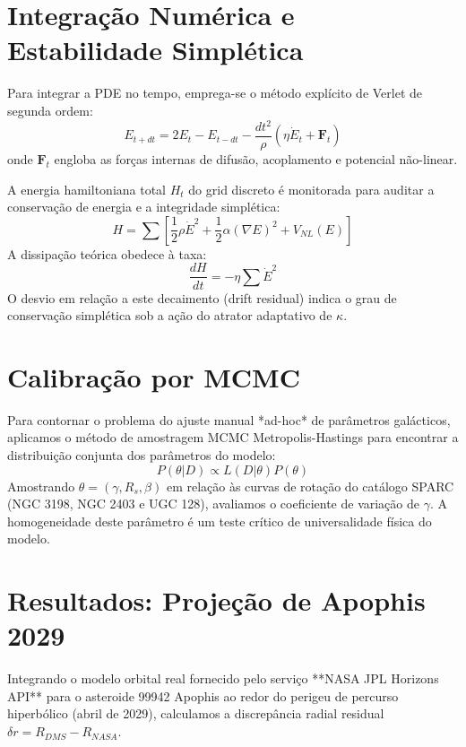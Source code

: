 \documentclass[11pt,twocolumn]{article}
\begin{document}
\section{Integração Numérica e Estabilidade Simplética}
Para integrar a PDE no tempo, emprega-se o método explícito de Verlet de segunda ordem:
\begin{equation}
E_{t+dt} = 2E_t - E_{t-dt} - \frac{dt^2}{\rho} \left( \eta \dot{E}_t + \mathbf{F}_t \right)
\end{equation}
onde $\mathbf{F}_t$ engloba as forças internas de difusão, acoplamento e potencial não-linear.

A energia hamiltoniana total $H_t$ do grid discreto é monitorada para auditar a conservação de energia e a integridade simplética:
\begin{equation}
H = \sum \left[ \frac{1}{2}\rho \dot{E}^2 + \frac{1}{2}\alpha (\nabla E)^2 + V_{NL}(E) \right]
\end{equation}
A dissipação teórica obedece à taxa:
\begin{equation}
\frac{dH}{dt} = -\eta \sum \dot{E}^2
\end{equation}
O desvio em relação a este decaimento (drift residual) indica o grau de conservação simplética sob a ação do atrator adaptativo de $\kappa$.

\section{Calibração por MCMC}
Para contornar o problema do ajuste manual *ad-hoc* de parâmetros galácticos, aplicamos o método de amostragem MCMC Metropolis-Hastings para encontrar a distribuição conjunta dos parâmetros do modelo:
\begin{equation}
P(\theta | D) \propto L(D | \theta) P(\theta)
\end{equation}
Amostrando $\theta = (\gamma, R_s, \beta)$ em relação às curvas de rotação do catálogo SPARC (NGC 3198, NGC 2403 e UGC 128), avaliamos o coeficiente de variação de $\gamma$. A homogeneidade deste parâmetro é um teste crítico de universalidade física do modelo.

\section{Resultados: Projeção de Apophis 2029}
Integrando o modelo orbital real fornecido pelo serviço **NASA JPL Horizons API** para o asteroide 99942 Apophis ao redor do perigeu de percurso hiperbólico (abril de 2029), calculamos a discrepância radial residual $\delta r = R_{DMS} - R_{NASA}$. 
\end{document}
